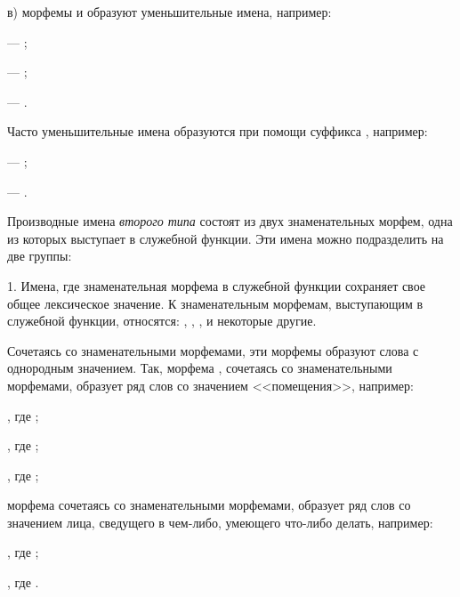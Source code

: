 в) морфемы  и  образуют уменьшительные имена, например:
\begin{prfsample}
    \item {} --- ;
    \item {} --- ;
    \item {} --- .
\end{prfsample}
Часто уменьшительные имена образуются при помощи суффикса , например:
\begin{prfsample}
    \item {} --- ;
    \item {} --- .
\end{prfsample}

Производные имена \emph{второго типа} состоят из двух знаменательных морфем, одна из которых выступает в служебной функции. Эти имена можно подразделить на две группы:

1. Имена, где знаменательная морфема в служебной функции сохраняет свое общее лексическое значение. К знаменательным морфемам, выступающим в служебной функции, относятся:
, , ,  и некоторые другие.

Сочетаясь со знаменательными морфемами, эти морфемы образуют слова с однородным значением. Так, морфема , сочетаясь со знаменательными морфемами, образует ряд слов со значением <<помещения>>, например:
\begin{prfsample}
    \item {}, где ;
    \item {}, где ;
    \item {}, где ;
\end{prfsample}
морфема  сочетаясь со знаменательными морфемами, образует ряд слов со значением лица, сведущего в чем-либо, умеющего что-либо делать, например:
\begin{prfsample}
    \item {}, где ;
    \item {}, где .
\end{prfsample}

